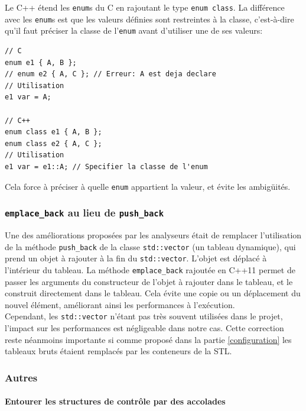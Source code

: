 Le C++ étend les \texttt{enum}s du C en rajoutant le type
\texttt{enum\ class}. La différence avec les \texttt{enum}s est que les
valeurs définies sont restreintes à la classe, c'est-à-dire qu'il faut
préciser la classe de l'\texttt{enum} avant d'utiliser une de ses
valeurs:

\lstset{language=C++}
\begin{lstlisting}
// C
enum e1 { A, B };
// enum e2 { A, C }; // Erreur: A est deja declare
// Utilisation
e1 var = A;

// C++
enum class e1 { A, B };
enum class e2 { A, C };
// Utilisation
e1 var = e1::A; // Specifier la classe de l'enum
\end{lstlisting}

Cela force à préciser à quelle \texttt{enum} appartient la valeur, et
évite les ambigüités.

\subsubsection{\texorpdfstring{\texttt{emplace\_back} au lieu de
\texttt{push\_back}}{emplace\_back au lieu de push\_back}}

Une des améliorations proposées par les analyseurs était de remplacer
l'utilisation de la méthode \texttt{push\_back} de la classe
\texttt{std::vector} (un tableau dynamique), qui prend un objet à
rajouter à la fin du \texttt{std::vector}. L'objet est déplacé à
l'intérieur du tableau. La méthode \texttt{emplace\_back} rajoutée en
C++11 permet de passer les arguments du constructeur de l'objet à
rajouter dans le tableau, et le construit directement dans le tableau.
Cela évite une copie ou un déplacement du nouvel élément, améliorant
ainsi les performances à l'exécution.\\
Cependant, les \texttt{std::vector} n'étant pas très souvent utilisées
dans le projet, l'impact sur les performances est négligeable dans notre
cas. Cette correction reste néanmoins importante si comme proposé dans
la partie \ref{configuration} les tableaux bruts étaient remplacés par
les conteneurs de la STL.

\subsubsection{Autres}

\paragraph{Entourer les structures de contrôle par des
accolades}


